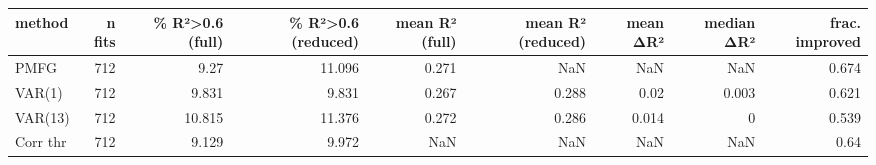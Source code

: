 \begin{tabular}{lrrrrrrrr}
\toprule
method & n fits & \% R²>0.6 (full) & \% R²>0.6 (reduced) & mean R² (full) & mean R² (reduced) & mean ΔR² & median ΔR² & frac. improved \\
\midrule
PMFG & 712 & 9.27 & 11.096 & 0.271 & NaN & NaN & NaN & 0.674 \\
VAR(1) & 712 & 9.831 & 9.831 & 0.267 & 0.288 & 0.02 & 0.003 & 0.621 \\
VAR(13) & 712 & 10.815 & 11.376 & 0.272 & 0.286 & 0.014 & 0 & 0.539 \\
Corr thr & 712 & 9.129 & 9.972 & NaN & NaN & NaN & NaN & 0.64 \\
\bottomrule
\end{tabular}
